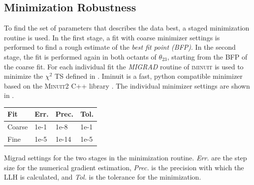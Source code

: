 \subsection{Minimization Robustness} 

To find the set of parameters that describes the data best, a staged minimization routine is used. In the first stage, a fit with coarse minimizer settings is performed to find a rough estimate of the \textit{best fit point (BFP)}. In the second stage, the fit is performed again in both octants of $\theta_{23}$, starting from the BFP of the coarse fit. For each individual fit the \textit{MIGRAD} routine of \textsc{iminuit}  is used to minimize the $\chi^2$ TS defined in . Iminuit is a fast, python compatible minimizer based on the \textsc{Minuit2} C++ library . The individual minimizer settings are shown in .

\begin{margintable}
    \small
        \begin{tabular}{ llll }
        \hline\hline
        \textbf{Fit} & \textbf{Err.} & \textbf{Prec.} & \textbf{Tol.} \\        
        \hline\hline    
        Coarse & 1e-1 & 1e-8 & 1e-1 \\
        Fine & 1e-5 & 1e-14 & 1e-5 \\    
        \hline
        \end{tabular}
    \caption[Staged minimization routine settings]{Migrad settings for the two stages in the minimization routine. \textit{Err.} are the step size for the numerical gradient estimation, \textit{Prec.} is the precision with which the LLH is calculated, and \textit{Tol.} is the tolerance for the minimization.}
\end{margintable}

